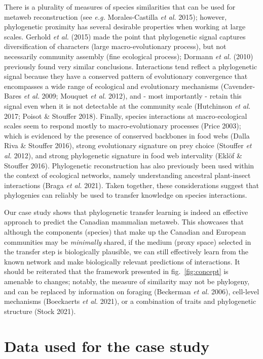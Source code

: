 \documentclass[10pt,oneside]{article}
\begin{document}
There is a plurality of measures of species similarities that can be
used for metaweb reconstruction (see \emph{e.g.} Morales-Castilla
\emph{et al.} 2015); however, phylogenetic proximity has several
desirable properties when working at large scales. Gerhold \emph{et al.}
(2015) made the point that phylogenetic signal captures diversification
of characters (large macro-evolutionary process), but not necessarily
community assembly (fine ecological process); Dormann \emph{et al.}
(2010) previously found very similar conclusions. Interactions tend
reflect a phylogenetic signal because they have a conserved pattern of
evolutionary convergence that encompasses a wide range of ecological and
evolutionary mechanisms (Cavender-Bares \emph{et al.} 2009; Mouquet
\emph{et al.} 2012), and - most importantly - retain this signal even
when it is not detectable at the community scale (Hutchinson \emph{et
al.} 2017; Poisot \& Stouffer 2018). Finally, species interactions at
macro-ecological scales seem to respond mostly to macro-evolutionary
processes (Price 2003); which is evidenced by the presence of conserved
backbones in food webs (Dalla Riva \& Stouffer 2016), strong
evolutionary signature on prey choice (Stouffer \emph{et al.} 2012), and
strong phylogenetic signature in food web intervality (Eklöf \& Stouffer
2016). Phylogenetic reconstruction has also previously been used within
the context of ecological networks, namely understanding ancestral
plant-insect interactions (Braga \emph{et al.} 2021). Taken together,
these considerations suggest that phylogenies can reliably be used to
transfer knowledge on species interactions.

Our case study shows that phylogenetic transfer learning is indeed an
effective approach to predict the Canadian mammalian metaweb. This
showcases that although the components (species) that make up the
Canadian and European communities may be \emph{minimally} shared, if the
medium (proxy space) selected in the transfer step is biologically
plausible, we can still effectively learn from the known network and
make biologically relevant predictions of interactions. It should be
reiterated that the framework presented in fig.~\ref{fig:concept} is
amenable to changes; notably, the measure of similarity may not be
phylogeny, and can be replaced by information on foraging (Beckerman
\emph{et al.} 2006), cell-level mechanisms (Boeckaerts \emph{et al.}
2021), or a combination of traits and phylogenetic structure (Stock
2021).

\hypertarget{data-used-for-the-case-study}{%
\section{Data used for the case
study}\label{data-used-for-the-case-study}}
\end{document}
